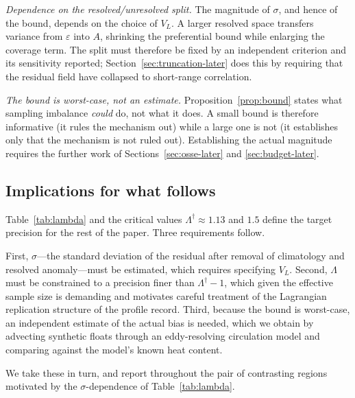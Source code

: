 \emph{Dependence on the resolved/unresolved split.} The magnitude of $\sigma$, and hence of
the bound, depends on the choice of $V_L$. A larger resolved space transfers variance from
$\varepsilon$ into $A$, shrinking the preferential bound while enlarging the coverage term. The
split must therefore be fixed by an independent criterion and its sensitivity reported;
Section~\ref{sec:truncation-later} does this by requiring that the residual field have
collapsed to short-range correlation.

\emph{The bound is worst-case, not an estimate.} Proposition~\ref{prop:bound} states what
sampling imbalance \emph{could} do, not what it does. A small bound is therefore informative
(it rules the mechanism out) while a large one is not (it establishes only that the mechanism
is not ruled out). Establishing the actual magnitude requires the further work of
Sections~\ref{sec:osse-later} and \ref{sec:budget-later}.

\subsection{Implications for what follows}
\label{sec:roadmap}

Table~\ref{tab:lambda} and the critical values $\Lambda^\dagger \approx 1.13$ and $1.5$ define
the target precision for the rest of the paper. Three requirements follow.

First, $\sigma$---the standard deviation of the residual after removal of climatology and
resolved anomaly---must be estimated, which requires specifying $V_L$. Second, $\Lambda$ must
be constrained to a precision finer than $\Lambda^\dagger - 1$, which given the effective
sample size is demanding and motivates careful treatment of the Lagrangian replication
structure of the profile record. Third, because the bound is worst-case, an independent
estimate of the actual bias is needed, which we obtain by advecting synthetic floats through
an eddy-resolving circulation model and comparing against the model's known heat content.

We take these in turn, and report throughout the pair of contrasting regions motivated by the
$\sigma$-dependence of Table~\ref{tab:lambda}.
